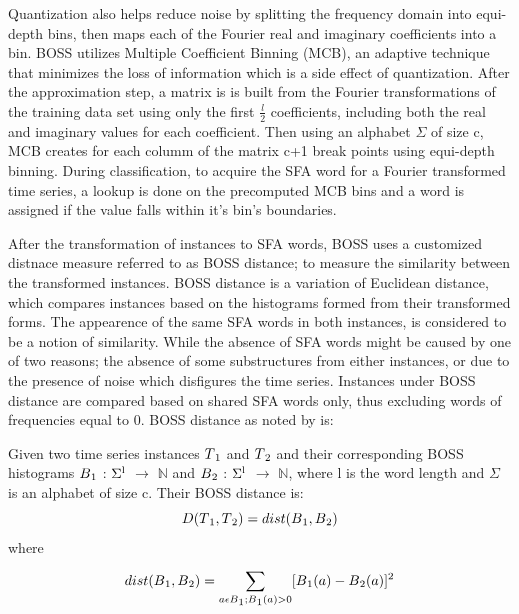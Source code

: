 Quantization also helps reduce noise by splitting the frequency domain into equi-depth bins, then maps each of the Fourier real and imaginary coefficients into a bin.
BOSS utilizes Multiple Coefficient Binning (MCB), an adaptive technique that minimizes the loss of information which is a side effect of quantization.
After the approximation step, a matrix is is built from the Fourier transformations of the training data set using only the first $\frac{l}{2}$ coefficients,
including both the real and imaginary values for each coefficient. Then using an alphabet $\Sigma$ of size c, MCB creates for each columm of the matrix c+1 break points
using equi-depth binning. During classification, to acquire the SFA word for a Fourier transformed time series, a lookup is done on the precomputed MCB bins and
a word is assigned if the value falls within it's bin's boundaries.

After the transformation of instances to SFA words, BOSS uses a customized distnace measure referred to as BOSS distance; to measure the similarity between the transformed instances.
BOSS distance is a variation of Euclidean distance, which compares instances based on the histograms formed from their transformed forms. The appearence of the same SFA words in both
instances, is considered to be a notion of similarity. While the absence of SFA words might be caused by one of two reasons; the absence of some substructures from either instances,
or due to the presence of noise which disfigures the time series. Instances under BOSS distance are compared based on shared SFA words only, thus excluding words of frequencies equal to 0.
BOSS distance as noted by \cite{schafer2015boss} is:

Given two time series instances $T\textsubscript{1}$ and $T\textsubscript{2}$ and their corresponding
BOSS histograms $B\textsubscript{1}$ : $\Sigma\textsuperscript{l}$ $\to$ $\mathbb{N}$
and $B\textsubscript{2}$ : $\Sigma\textsuperscript{l}$ $\to$ $\mathbb{N}$, where l is the word length and $\Sigma$ is an alphabet of size c. Their BOSS distance is:
\begin{equation}
        D(T\textsubscript{1},T\textsubscript{2}) = dist(B\textsubscript{1},B\textsubscript{2})
\end{equation}
where
\begin{equation}
    dist(B\textsubscript{1},B\textsubscript{2}) = \sum_{a \epsilon B\textsubscript{1};B\textsubscript{1}(a)>0}^{} [B\textsubscript{1}(a) - B\textsubscript{2}(a)]\textsuperscript{2}
\end{equation}

